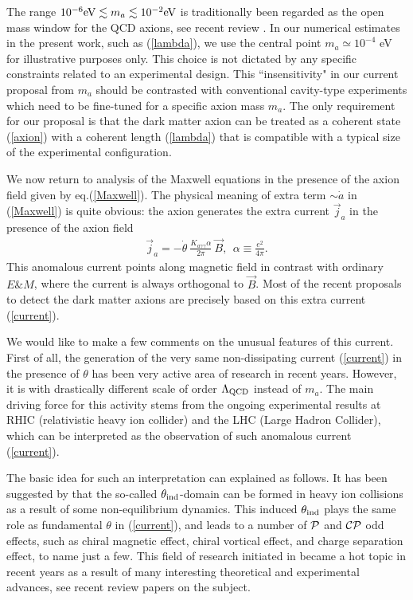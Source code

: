 \documentclass[ twocolumn,aps,prd,   
               preprintnumbers,numbers,sort&compress,nofootinbib,
                            showpacs,superscriptaddress,
               colorlinks,
               linkcolor=blue,   
               citecolor=blue]{revtex4-1}   \newcommand{\exclude}[1]{}
\newcommand{\be}{\begin{eqnarray}}
\newcommand{\ee}{\end{eqnarray}}
\begin{document}
 The range  $10^{-6} {\rm eV}\lesssim  m_a\lesssim   10^{-2} {\rm eV}$  is traditionally been regarded as the open mass window for the QCD axions, see recent review \cite{Graham:2015ouw}. In our  numerical estimates in the present work, such as (\ref{lambda}),   we use the central point $m_a\simeq 10^{-4}$ eV for illustrative purposes only.   This  choice is not dictated by any specific constraints related to an experimental design.  
 This ``insensitivity"    in our  
   current proposal  from  $m_a$ should be contrasted with conventional cavity-type experiments which  need to be fine-tuned for  a specific axion
   mass $m_a$.  The only requirement for our proposal is that the dark matter axion can be treated as  a coherent state (\ref{axion}) with a coherent length (\ref{lambda}) that is compatible with a typical size of the experimental configuration.
 

We now return to analysis of the Maxwell equations in the presence of the axion field given by eq.(\ref{Maxwell}).  
The physical meaning of extra term $\sim \dot{a}$ in (\ref{Maxwell})  is quite obvious: the axion generates the extra current $\vec{j}_a$ 
in the presence of the axion field
 \be
 \label{current}
 \vec{j}_a=  - \dot{\theta}~\frac{K_{a\gamma\gamma} \alpha}{2\pi} ~\vec{B}, ~~ \alpha\equiv \frac{e^2}{4\pi}.
 \ee
This anomalous current points  along magnetic field in contrast with ordinary $E\&M$, where the current is always orthogonal to $\vec{B}$.
Most of the recent proposals \cite{Budker:2013hfa,Graham:2013gfa,Rybka:2014cya,Sikivie:2013laa,Beck,Stadnik:2013raa,Sikivie:2014lha,McAllister:2015zcz,Hill:2015kva,Hill:2015vma,Barbieri:2016vwg, Arvanitaki:2014dfa,Kahn:2016aff} to detect the dark matter   axions    are precisely based on this extra current (\ref{current}).

  We would like to make a few comments on the unusual features of this current.
  First of all, the generation of the very same non-dissipating current (\ref{current}) in the presence of $\theta$
  has been very active area of research  in recent years.  However, it is with drastically different scale of order $\Lambda_{\rm QCD}$ instead of $m_a$. The main driving force for this activity stems from the ongoing experimental results 
  at RHIC (relativistic heavy ion collider) and the LHC (Large Hadron Collider), which can be interpreted as the observation of such anomalous current (\ref{current}). 
  
  The basic idea for such an interpretation can explained as follows. It has been suggested by \cite{Kharzeev:1998kz,Buckley:1999mv} that the so-called  $\theta_{\rm ind}$-domain can be formed in heavy ion collisions as a result of some non-equilibrium dynamics. This induced $\theta_{\rm ind}$ plays the same role as fundamental $\theta$ in (\ref{current}), 
 and leads to a number of $\cal{P}$ and $\cal{CP}$ odd effects, such as chiral magnetic effect, chiral vortical effect, and charge separation effect, to name just a few.   
 This field  of research initiated in \cite{Kharzeev:2007tn}  became a hot topic  in recent years as a result of many interesting theoretical and experimental advances,    see recent review papers \cite{Kharzeev:2009fn,Kharzeev:2015znc} on the subject. 
 
\end{document}
